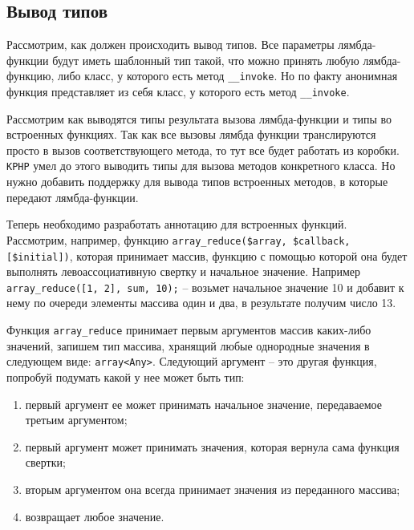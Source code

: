 \subsection{Вывод типов}
Рассмотрим, как должен происходить вывод типов.
Все параметры лямбда-функции будут иметь шаблонный тип такой, что можно принять любую лямбда-функцию, либо класс, у которого есть метод \verb|__invoke|.
Но по факту анонимная функция представляет из себя класс, у которого есть метод \verb|__invoke|.

Рассмотрим как выводятся типы результата вызова лямбда-функции и типы во встроенных функциях.
Так как все вызовы лямбда функции транслируются просто в вызов соответствующего метода, то тут все будет работать из коробки.
\verb|KPHP| умел до этого выводить типы для вызова методов конкретного класса.
Но нужно добавить поддержку для вывода типов встроенных методов, в которые передают лямбда-функции.

Теперь необходимо разработать аннотацию для встроенных функций.
Рассмотрим, например, функцию \verb|array_reduce($array, $callback, [$initial])|, которая принимает массив, функцию с помощью которой она будет выполнять левоассоциативную свертку \cite{foldl} и начальное значение.
Например \verb|array_reduce([1, 2], sum, 10);| -- возьмет начальное значение 10 и добавит к нему по очереди элементы массива один и два, в результате получим число 13.

Функция \verb|array_reduce| принимает первым аргументов массив каких-либо значений, запишем тип массива, хранящий любые однородные значения в следующем виде: \verb|array<Any>|.
Следующий аргумент -- это другая функция, попробуй подумать какой у нее может быть тип:
\begin{enumerate}
  \item первый аргумент ее может принимать начальное значение, передаваемое третьим аргументом;
  \item первый аргумент может принимать значения, которая вернула сама функция свертки;
  \item вторым аргументом она всегда принимает значения из переданного массива;
  \item возвращает любое значение.
\end{enumerate}


